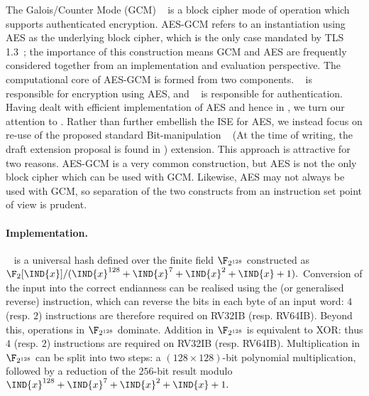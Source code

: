 \noindent
The Galois/Counter Mode (GCM) ~\cite{NIST:sp.800.38d}
is a block cipher mode of operation which 
supports authenticated encryption.
AES-GCM refers to an instantiation using AES as the underlying block cipher, 
which is the only case mandated by TLS 1.3~\cite[Section 9.1]{rfc:8446}; the
importance of this construction means GCM and AES are frequently considered 
together from an implementation and evaluation perspective.
The computational core of AES-GCM is formed from two components.
 ~\cite[Section 6.5]{NIST:sp.800.38d}
is responsible for 
    encryption
using AES,
and
~\cite[Section 6.4]{NIST:sp.800.38d}
is responsible for
authentication.
Having dealt with efficient implementation of AES and hence  in
, we turn our attention to .  
Rather than further 
embellish the ISE for AES, we instead focus on re-use of the proposed
standard 
Bit-manipulation ~\cite[Section 17]{RV:ISA:I:19}
(At the time of writing, the draft extension proposal is found in
\cite{riscv:bitmanip:draft})
extension.
This approach is attractive for two reasons.
AES-GCM is a very common construction, but AES is not the only block
cipher which can be used with GCM.
Likewise, AES may not always be used with GCM, so separation of
the two constructs from an instruction set point of view is prudent.


\paragraph{Implementation.}

~\cite[Section 6.4]{NIST:sp.800.38d} is a universal hash defined 
over the finite field $\F_{2^{128}}$ constructed as
$
\F_{2}[\IND{x}] / ( \IND{x}^{128} + \IND{x}^{7} + \IND{x}^{2} + \IND{x} + 1 ) .
$
Conversion of the input into the correct endianness can be realised using
the 
 (or generalised reverse)
instruction,
which can reverse the bits in each byte of an input word:
$4$ (resp. $2$) 
instructions are therefore required on RV32IB (resp. RV64IB).
Beyond this, operations in $\F_{2^{128}}$ dominate.
Addition       in $\F_{2^{128}}$ 
is equivalent to XOR: thus
$4$ (resp. $2$) 
instructions are required on RV32IB (resp. RV64IB).
Multiplication in $\F_{2^{128}}$ 
can be split into two steps:
a $( 128 \times 128 )$-bit polynomial multiplication, 
followed by 
a reduction of the $256$-bit result modulo
$
\IND{x}^{128} + \IND{x}^{7} + \IND{x}^{2} + \IND{x} + 1 .
$

